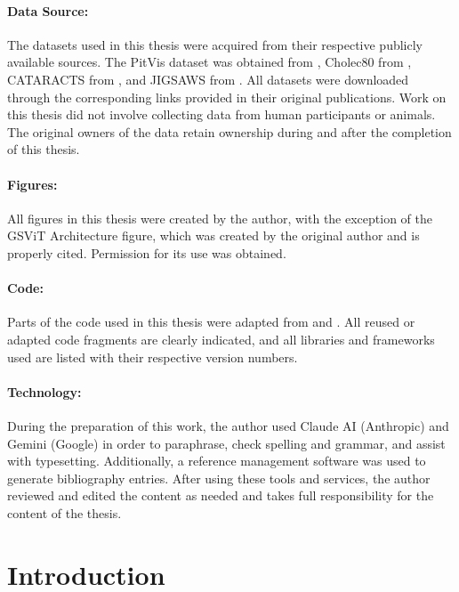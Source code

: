\documentclass[11pt, a4paper]{article}
\begin{document}
\paragraph{Data Source:} The datasets used in this thesis were acquired from their respective publicly available sources. The PitVis dataset was obtained from \textcite{das-2025}, Cholec80 from \textcite{endonet-2016}, CATARACTS from \textcite{ac97-8m18-21}, and JIGSAWS from \textcite{Gao2014JIGSAWS}. All datasets were downloaded through the corresponding links provided in their original publications. Work on this thesis did not involve collecting data from human participants or animals. The original owners of the data retain ownership during and after the completion of this thesis. \paragraph{Figures:} All figures in this thesis were created by the author, with the exception of the GSViT Architecture figure, which was created by the original author and is properly cited. Permission for its use was obtained. \paragraph{Code:} Parts of the code used in this thesis were adapted from \textcite{maes-2026} and \textcite{schmidgall2024general}. All reused or adapted code fragments are clearly indicated, and all libraries and frameworks used are listed with their respective version numbers. \paragraph{Technology:} During the preparation of this work, the author used Claude AI (Anthropic) and Gemini (Google) in order to paraphrase, check spelling and grammar, and assist with typesetting. Additionally, a reference management software was used \textcite{scribbr} to generate bibliography entries. After using these tools and services, the author reviewed and edited the content as needed and takes full responsibility for the content of the thesis.


\section{Introduction} \label{sec:introduction}
\end{document}
